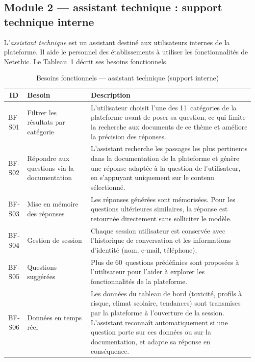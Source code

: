 \subsection{Module 2 — assistant technique : support technique interne}

L'\textit{assistant technique} est un assistant destiné aux utilisateurs internes de la plateforme.
Il aide le personnel des établissements à utiliser les fonctionnalités de Netethic.
Le Tableau~\ref{tab:bf_nesa} décrit ses besoins fonctionnels.

\vspace{6pt}
\begin{table}[H]
\caption{Besoins fonctionnels — assistant technique (support interne)}
\label{tab:bf_nesa}
\centering
\small
\setlength{\tabcolsep}{4pt}
\begin{tabular}{|c|p{3.5cm}|p{9.5cm}|}
\hline
\textbf{ID} & \textbf{Besoin} & \textbf{Description} \\
\hline
BF-S01 & Filtrer les résultats par catégorie
        & L'utilisateur choisit l'une des 11~catégories de la plateforme avant de poser sa question, ce qui limite la recherche aux documents de ce thème et améliore la précision des réponses. \\
\hline
BF-S02 & Répondre aux questions via la documentation
        & L'assistant recherche les passages les plus pertinents dans la documentation de la plateforme et génère une réponse adaptée à la question de l'utilisateur, en s'appuyant uniquement sur le contenu sélectionné. \\
\hline
BF-S03 & Mise en mémoire des réponses
        & Les réponses générées sont mémorisées. Pour les questions ultérieures similaires, la réponse est retournée directement sans solliciter le modèle. \\
\hline
BF-S04 & Gestion de session
        & Chaque session utilisateur est conservée avec l'historique de conversation et les informations d'identité (nom, e-mail, téléphone). \\
\hline
BF-S05 & Questions suggérées
        & Plus de 60~questions prédéfinies sont proposées à l'utilisateur pour l'aider à explorer les fonctionnalités de la plateforme. \\
\hline
BF-S06 & Données en temps réel
        & Les données du tableau de bord (toxicité, profils à risque, climat scolaire, tendances) sont transmises par la plateforme à l'ouverture de la session. L'assistant reconnaît automatiquement si une question porte sur ces données ou sur la documentation, et adapte sa réponse en conséquence. \\

\end{tabular}
\end{table}
